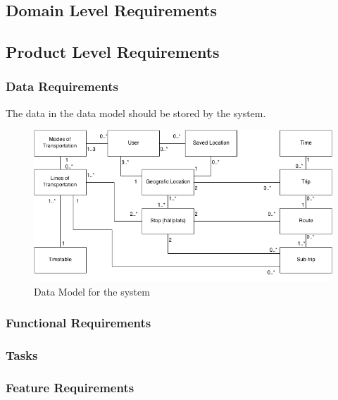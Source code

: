 \documentclass[a4paper]{article}
\begin{document}
		\subsection{Domain Level Requirements}

		\subsection{Product Level Requirements}

			\subsubsection{Data Requirements}

				The data in the data model should be stored by the system.	
				\begin{figure}[ht]
					\includegraphics[scale=0.50]{datamodel-v1.png}
					\caption{Data Model for the system}
				\end{figure}
				
				
				
			\subsubsection{Functional Requirements}
				\subsubsection{Tasks}
					
		
			\subsubsection{Feature Requirements}
							
\end{document}
